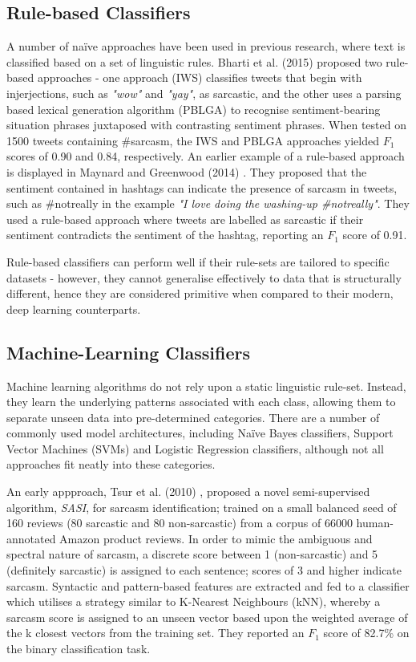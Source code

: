\documentclass[12pt,a4paper]{article}
\begin{document}
\subsection{Rule-based Classifiers}\vspace{-10pt}
\noindent A number of na\"{i}ve approaches have been used in previous research, where text is classified based on a set of linguistic rules. Bharti et al. (2015) \cite{bharti2015parsing} proposed two rule-based approaches - one approach (IWS) classifies tweets that begin with injerjections, such as \textit{"wow"} and \textit{"yay"}, as sarcastic, and the other uses a parsing based lexical generation algorithm (PBLGA) to recognise sentiment-bearing situation phrases juxtaposed with contrasting sentiment phrases. When tested on 1500 tweets containing \#sarcasm, the IWS and PBLGA approaches yielded $F_1$ scores of 0.90 and 0.84, respectively. An earlier example of a rule-based approach is displayed in Maynard and Greenwood (2014) \cite{maynard2014cares}. They proposed that the sentiment contained in hashtags can indicate the presence of sarcasm in tweets, such as \#notreally in the example \textit{"I love doing the washing-up \#notreally"}. They used a rule-based approach where tweets are labelled as sarcastic if their sentiment contradicts the sentiment of the hashtag, reporting an $F_{1}$ score of 0.91. 

Rule-based classifiers can perform well if their rule-sets are tailored to specific datasets - however, they cannot generalise effectively to data that is structurally different, hence they are considered  primitive when compared to their modern, deep learning counterparts.

\subsection{Machine-Learning Classifiers}\vspace{-10pt}
\noindent Machine learning algorithms do not rely upon a static linguistic rule-set. Instead, they learn the underlying patterns associated with each class, allowing them to separate unseen data into pre-determined categories. There are a number of commonly used model architectures, including Na\"{i}ve Bayes classifiers, Support Vector Machines (SVMs) and Logistic Regression classifiers, although not all approaches fit neatly into these categories.

An early appproach, Tsur et al. (2010) \cite{tsur2010icwsm}, proposed a novel semi-supervised algorithm, \textit{SASI}, for sarcasm identification; trained on a small balanced seed of 160 reviews (80 sarcastic and 80 non-sarcastic) from a corpus of 66000 human-annotated Amazon product reviews. In order to mimic the ambiguous and spectral nature of sarcasm, a discrete score between 1 (non-sarcastic) and 5 (definitely sarcastic) is assigned to each sentence; scores of 3 and higher indicate sarcasm. Syntactic and pattern-based features are extracted and fed to a classifier which utilises a strategy similar to K-Nearest Neighbours (kNN), whereby a sarcasm score is assigned to an unseen vector based upon the weighted average of the k closest vectors from the training set. They reported an $F_{1}$ score of 82.7\% on the binary classification task.
\end{document}

